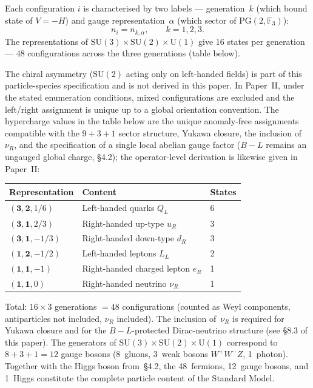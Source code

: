 \documentclass[12pt,a4paper]{article}
\begin{document}
Each configuration $i$ is characterised by two labels --- generation~$k$ (which bound state of $V = -H$) and gauge representation~$\alpha$ (which sector of $\mathrm{PG}(2, \mathbb{F}_3)$):
\begin{equation}
  n_i = n_{k,\alpha},\qquad k = 1, 2, 3.
\end{equation}
The representations of $\mathrm{SU}(3){\times}\mathrm{SU}(2){\times}\mathrm{U}(1)$ give 16 states per generation --- 48 configurations across the three generations (table below).

The chiral asymmetry ($\mathrm{SU}(2)$ acting only on left-handed fields) is part of this particle-species specification and is not derived in this paper. In Paper~II, under the stated enumeration conditions, mixed configurations are excluded and the left/right assignment is unique up to a global orientation convention.
The hypercharge values in the table below are the unique anomaly-free assignments compatible with the $9{+}3{+}1$ sector structure, Yukawa closure, the inclusion of~$\nu_R$, and the specification of a single local abelian gauge factor ($B{-}L$ remains an ungauged global charge, \S4.2); the operator-level derivation is likewise given in Paper~II:

\vspace*{0.4\baselineskip}
\begin{center}
\small
\renewcommand{\arraystretch}{1.15}
\begin{tabular}{@{}l@{\qquad}l@{\qquad}l@{}}
\toprule
Representation & Content & States \\
\midrule
$(\mathbf{3},\mathbf{2},1/6)$ & Left-handed quarks $Q_L$ & 6 \\
$(\mathbf{3},\mathbf{1},2/3)$ & Right-handed up-type $u_R$ & 3 \\
$(\mathbf{3},\mathbf{1},-1/3)$ & Right-handed down-type $d_R$ & 3 \\
$(\mathbf{1},\mathbf{2},-1/2)$ & Left-handed leptons $L_L$ & 2 \\
$(\mathbf{1},\mathbf{1},-1)$ & Right-handed charged lepton $e_R$ & 1 \\
$(\mathbf{1},\mathbf{1},0)$ & Right-handed neutrino $\nu_R$ & 1 \\
\bottomrule
\end{tabular}
\end{center}
\noindent
Total: $16 \times 3$ generations $= 48$ configurations (counted as Weyl components, antiparticles not included, $\nu_R$ included).
The inclusion of~$\nu_R$ is required for Yukawa closure
and for the $B{-}L$-protected Dirac-neutrino structure (see \S8.3 of this paper).
The generators of $\mathrm{SU}(3){\times}\mathrm{SU}(2){\times}\mathrm{U}(1)$
correspond to $8{+}3{+}1 = 12$ gauge bosons
(8~gluons, 3~weak bosons $W^+W^-Z$, 1~photon).
Together with the Higgs boson from~\S4.2, the 48~fermions, 12~gauge bosons,
and 1~Higgs constitute the complete particle content of the Standard Model.
\end{document}
